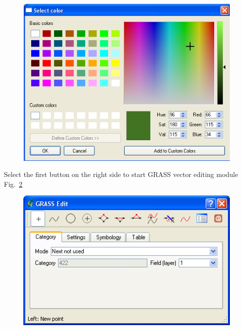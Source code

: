 \begin{figure}[htbp]
   \centering
   \includegraphics[scale=0.35]{qgis023.png}
   \caption{}
   \label{fig:qgis023}
\end{figure}

Select the first button on the right side to start GRASS vector editing
module Fig.~\ref{fig:qgis024}

\begin{figure}[htbp]
   \centering
   \includegraphics[scale=0.4]{qgis024.png}
   \caption{}
   \label{fig:qgis024}
\end{figure}

